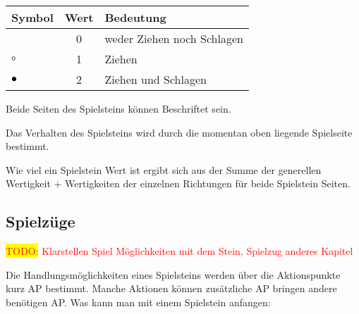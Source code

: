 \documentclass{article}
\newcommand{\todo}[1]{\textcolor{red}{\colorbox{yellow}{TODO:} #1\\}}
\begin{document}
	\begin{tabular}{lcl}
	\hline
	Symbol & Wert & Bedeutung  \\  \hline
									& 0 & weder Ziehen noch Schlagen \\
	\textcolor{black}{$\circ$}		& 1 & Ziehen \\ 
	\textcolor{black}{$\bullet$} 	& 2 & Ziehen und Schlagen  \\ 
	\end{tabular}
	 
	\vspace{0.3cm}
    
    \begin{flushleft}
    
    Beide Seiten des Spielsteins können Beschriftet sein.
    
	Das Verhalten des Spielsteins wird durch die momentan oben liegende Spielseite bestimmt.
	
	
	Wie viel ein Spielstein Wert ist ergibt sich aus der Summe der generellen Wertigkeit + Wertigkeiten der einzelnen Richtungen für beide Spielstein Seiten.
	\end{flushleft}
	
	
	
	
\subsection{Spielzüge}

	\todo{Klarstellen Spiel Möglichkeiten mit dem Stein, Spielzug anderes Kapitel}


	Die Handlungsmöglichkeiten eines Spielsteins werden über die Aktionspunkte kurz AP bestimmt.
	Manche Aktionen können zusätzliche AP bringen andere benötigen AP.
	Was kann man mit einem Spielstein anfangen:
\end{document}
